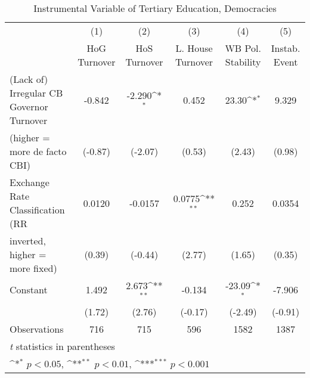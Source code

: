 \begin{table}[htbp]\centering
\def\sym#1{\ifmmode^{#1}\else\(^{#1}\)\fi}
\caption{Instrumental Variable of Tertiary Education, Democracies \label{demIfivs2}}
\begin{tabular}{l*{5}{c}}
\toprule
                                        &\multicolumn{1}{c}{(1)}&\multicolumn{1}{c}{(2)}&\multicolumn{1}{c}{(3)}&\multicolumn{1}{c}{(4)}&\multicolumn{1}{c}{(5)}\\
                                        &\multicolumn{1}{c}{HoG Turnover}&\multicolumn{1}{c}{HoS Turnover}&\multicolumn{1}{c}{L. House Turnover}&\multicolumn{1}{c}{WB Pol. Stability}&\multicolumn{1}{c}{Instab. Event}\\
\midrule
(Lack of) Irregular CB Governor Turnover&   -0.842         &   -2.290\sym{*}  &    0.452         &    23.30\sym{*}  &    9.329         \\
(higher = more de facto CBI)            &  (-0.87)         &  (-2.07)         &   (0.53)         &   (2.43)         &   (0.98)         \\
\addlinespace
Exchange Rate Classification (RR        &   0.0120         &  -0.0157         &   0.0775\sym{**} &    0.252         &   0.0354         \\
inverted, higher = more fixed)          &   (0.39)         &  (-0.44)         &   (2.77)         &   (1.65)         &   (0.35)         \\
\addlinespace
Constant                                &    1.492         &    2.673\sym{**} &   -0.134         &   -23.09\sym{*}  &   -7.906         \\
                                        &   (1.72)         &   (2.76)         &  (-0.17)         &  (-2.49)         &  (-0.91)         \\
\midrule
Observations                            &      716         &      715         &      596         &     1582         &     1387         \\
\bottomrule
\multicolumn{6}{l}{\footnotesize \textit{t} statistics in parentheses}\\
\multicolumn{6}{l}{\footnotesize \sym{*} \(p<0.05\), \sym{**} \(p<0.01\), \sym{***} \(p<0.001\)}\\
\end{tabular}
\end{table}
